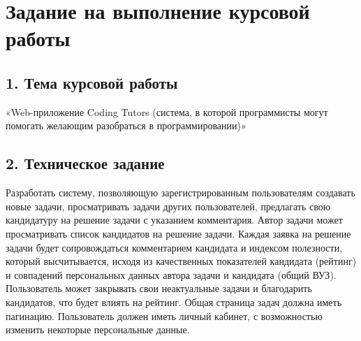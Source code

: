 \chapter{Задание на выполнение курсовой работы}

\section{1. Тема курсовой работы}
«Web-приложение Coding Tutors (система, в которой программисты могут помогать желающим разобраться в программировании)»

\section{2. Техническое задание}
Разработать  систему, позволяющую зарегистрированным пользователям создавать новые задачи, просматривать задачи других пользователей, предлагать свою кандидатуру на решение задачи с указанием комментария. Автор задачи может просматривать список кандидатов на решение задачи. Каждая заявка на решение задачи будет сопровождаться комментарием кандидата и индексом полезности, который высчитывается, исходя из качественных показателей кандидата (рейтинг) и совпадений персональных данных автора задачи и кандидата (общий ВУЗ). Пользователь может закрывать свои неактуальные задачи и благодарить кандидатов, что будет влиять на рейтинг. Общая страница задач должна иметь пагинацию. Пользователь должен иметь личный кабинет, с возможностью изменить некоторые персональные данные.
